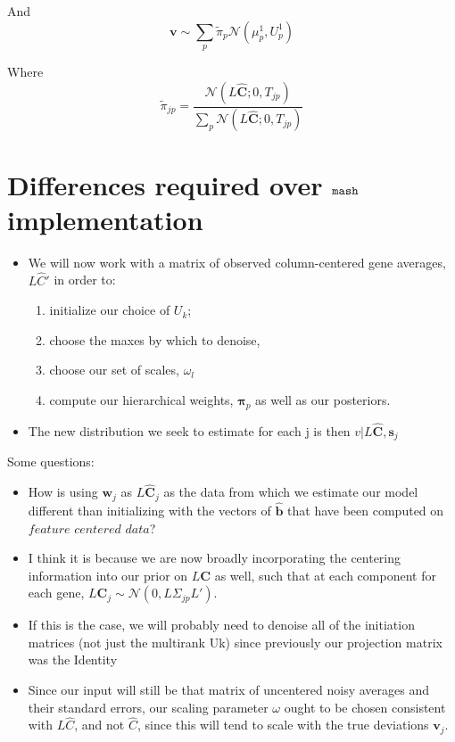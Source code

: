 \documentclass[11pt, oneside]{article}   	%
\newcommand{\Norm}{{\mathcal{N}}} %
\newcommand{\ceff}{\bm{C}}
\newcommand{\chat}{\bm{\hat{C}}}
\newcommand{\vb}{\bm{v}}
\def\mash{{\tt mash}}
\begin{document}
\begin{itemize}
And 
\begin{equation}
\vb \sim \sum_p \tilde{\pi}_{p}   \Norm ( \mu_{p}^{1}, U_{p}^{1})
\end{equation}

Where 
\begin{equation}
\tilde{\pi}_{jp} = \frac{\Norm(L\chat;0, T_{jp})}{\sum_{p} \Norm(L\chat;0, T_{jp})}
\end{equation}

\section{Differences required over $\mash$ implementation}

\begin{itemize}
\item We will now work with a matrix of observed column-centered gene averages, $L \hat{C} '$ in order to:
\begin{enumerate}
	\item initialize our choice of $U_{k}$;
	\item  choose the maxes by which to denoise, 
	\item choose our set of scales, $\omega_{l}$
	\item compute our hierarchical weights, $\bm{\pi}_{p}$ as well as our posteriors. 
\end{enumerate}
\item The new distribution we seek to estimate for each j is then $v | L \chat , \bm{s}_{j}$
\end{itemize}

Some questions:

\begin{itemize}
\item How is using $\bm{w}_{j}$ as $L\chat_{j}$ as the data from which we estimate our model different than initializing with the vectors of $\hat{\bm{b}}$ that have been computed on $\textit{feature centered data}$?
\item  I think it is because we are now broadly incorporating the centering information into our prior on $L \ceff$ as well, such that at each component for each gene, $L \ceff_{j} \sim \Norm (0, L \Sigma_{jp} L')$.
\item If this is the case, we will probably need to denoise all of the initiation matrices (not just the multirank Uk) since previously our projection matrix was the Identity
\item Since our input will still be that matrix     of uncentered noisy averages and their standard errors, our scaling parameter $\omega$ ought to be chosen consistent with $L \hat C$, and not $\hat C$, since this will tend to scale with the true deviations $\vb_{j}$.
\end{itemize}


\end{itemize}
\end{document}
